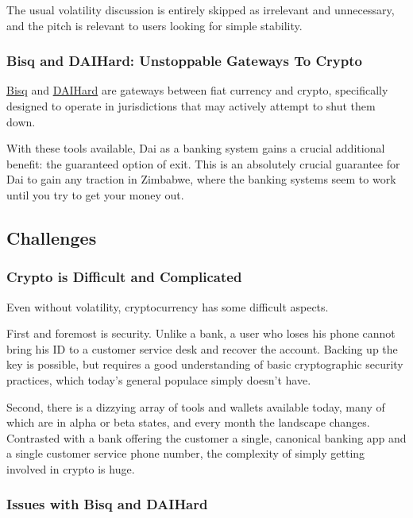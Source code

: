 \documentclass{article}
\begin{document}
The usual volatility discussion is entirely skipped as irrelevant and unnecessary, and the pitch is relevant to users looking for simple stability.

\subsubsection{Bisq and DAIHard: Unstoppable Gateways To Crypto} \label{exchanges}

\href{https://bisq.network/}{Bisq} and \href{daihard.io}{DAIHard} are gateways between fiat currency and crypto, specifically designed to operate in jurisdictions that may actively attempt to shut them down.

With these tools available, Dai as a banking system gains a crucial additional benefit: the guaranteed option of exit. This is an absolutely crucial guarantee for Dai to gain any traction in Zimbabwe, where the banking systems seem to work until you try to get your money out.

\subsection{Challenges} \label{challenges}

\subsubsection{Crypto is Difficult and Complicated} \label{difficult}

Even without volatility, cryptocurrency has some difficult aspects.

First and foremost is security. Unlike a bank, a user who loses his phone cannot bring his ID to a customer service desk and recover the account. Backing up the key is possible, but requires a good understanding of basic cryptographic security practices, which today's general populace simply doesn't have.

Second, there is a dizzying array of tools and wallets available today, many of which are in alpha or beta states, and every month the landscape changes. Contrasted with a bank offering the customer a single, canonical banking app and a single customer service phone number, the complexity of simply getting involved in crypto is huge.

\subsubsection{Issues with Bisq and DAIHard} \label{exchange issues}
\end{document}
